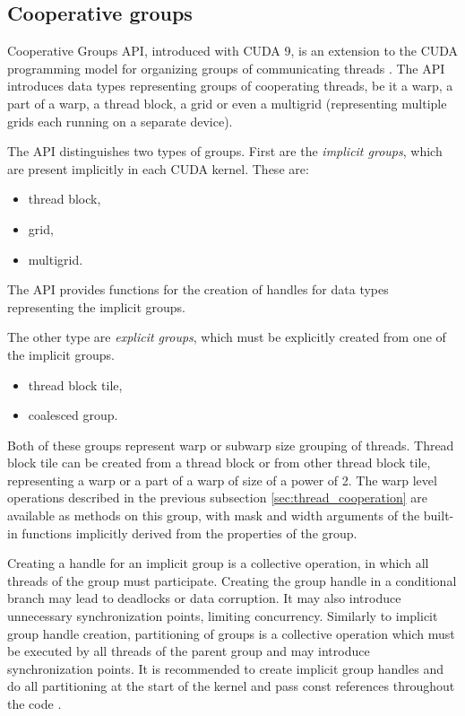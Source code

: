\subsection{Cooperative groups}
\label{sec:cooperative_groups}

Cooperative Groups API, introduced with CUDA 9, is an extension to the CUDA programming model for organizing groups of communicating threads \citep{site:cuda}. The API introduces data types representing groups of cooperating threads, be it a warp, a part of a warp, a thread block, a grid or even a multigrid (representing multiple grids each running on a separate device). 


The API distinguishes two types of groups. First are the \textit{implicit groups}, which are present implicitly in each CUDA kernel. These are:

\begin{itemize}
	\item thread block,
	\item grid,
	\item multigrid.
\end{itemize}

The API provides functions for the creation of handles for data types representing the implicit groups. 

The other type are \textit{explicit groups}, which must be explicitly created from one of the implicit groups. 

\begin{itemize}
	\item thread block tile,
	\item coalesced group.
\end{itemize}

Both of these groups represent warp or subwarp size grouping of threads. Thread block tile can be created from a thread block or from other thread block tile, representing a warp or a part of a warp of size of a power of 2. The warp level operations described in the previous subsection \ref{sec:thread_cooperation} are available as methods on this group, with mask and width arguments of the built-in functions implicitly derived from the properties of the group. 



Creating a handle for an implicit group is a collective operation, in which all threads of the group must participate. Creating the group handle in a conditional branch may lead to deadlocks or data corruption. It may also introduce unnecessary synchronization points, limiting concurrency. Similarly to implicit group handle creation, partitioning of groups is a collective operation which must be executed by all threads of the parent group and may introduce synchronization points. It is recommended to create implicit group handles and do all partitioning at the start of the kernel and pass const references throughout the code \cite{site:cuda}.

